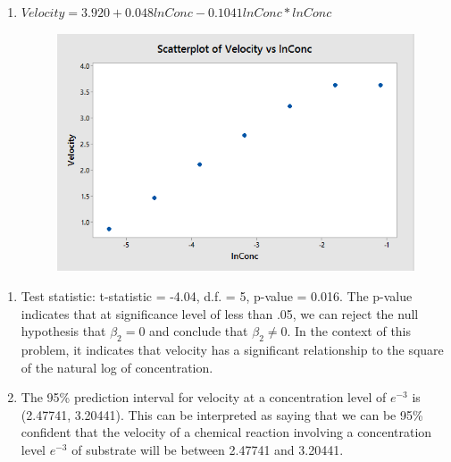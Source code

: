 \documentclass{article}
\providecommand{\tightlist}{%
      \setlength{\itemsep}{0pt}\setlength{\parskip}{0pt}}
\begin{document}
\begin{enumerate}
\def\labelenumi{\alph{enumi})}
\setcounter{enumi}{3}
\tightlist
\item
  \(Velocity = 3.920 + 0.048 lnConc - 0.1041 lnConc*lnConc\)
  
  \begin{figure}[h!]
 \centering
 \includegraphics[scale=.5]{./images/scatterplot_velocity-vs-lnConc.png}
\end{figure}
\end{enumerate}

\begin{enumerate}
\def\labelenumi{\alph{enumi})}
\setcounter{enumi}{4}
\item
  Test statistic: t-statistic = -4.04, d.f. = 5, p-value = 0.016. The
  p-value indicates that at significance level of less than .05, we can
  reject the null hypothesis that \(\beta_2 = 0\) and conclude that
  \(\beta_2 \ne 0\). In the context of this problem, it indicates that
  velocity has a significant relationship to the square of the natural
  log of concentration.
\item
  The 95\% prediction interval for velocity at a concentration level of
  \(e^{-3}\) is (2.47741, 3.20441). This can be interpreted as saying
  that we can be 95\% confident that the velocity of a chemical reaction
  involving a concentration level \(e^{-3}\) of substrate will be
  between 2.47741 and 3.20441.
\end{enumerate}


    
    
    
    
\end{document}
